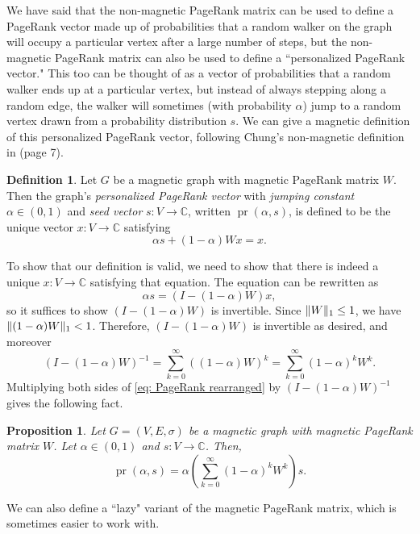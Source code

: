 \documentclass{article}
\newtheorem{prop}[thm]{Proposition}
\theoremstyle{definition}
\newtheorem{defn}[thm]{Definition}
\newcommand{\C}{\mathbb C}
\DeclarePairedDelimiter\norm{\lVert}{\rVert}
\DeclareMathOperator{\pr}{pr}
\begin{document}
We have said that the non-magnetic PageRank matrix can be used to define a PageRank vector made up of probabilities that a random walker on the graph will occupy a particular vertex after a large number of steps, but the non-magnetic PageRank matrix can also be used to define a ``personalized PageRank vector." This too can be thought of as a vector of probabilities that a random walker ends up at a particular vertex, but instead of always stepping along a random edge, the walker will sometimes (with probability $\alpha$) jump to a random vertex drawn from a probability distribution $s$. We can give a magnetic definition of this personalized PageRank vector, following Chung's non-magnetic definition in \cite{pagerankgreen} (page 7).

\begin{defn}
Let $G$ be a magnetic graph with magnetic PageRank matrix $W$. Then the graph's \textit{personalized PageRank vector} with \textit{jumping constant} $\alpha \in (0, 1)$ and \textit{seed vector} $s: V \rightarrow \C$, written $\pr(\alpha, s)$, is defined to be the unique vector $x: V \rightarrow \C$ satisfying
$$
\alpha s + (1 - \alpha) W x = x.
$$
\end{defn}

To show that our definition is valid, we need to show that there is indeed a unique $x : V \rightarrow \C$ satisfying that equation. The equation can be rewritten as 
\begin{equation}
\alpha s = (I - (1 - \alpha)W)x,\label{eq: PageRank rearranged}
\end{equation}
so it suffices to show $(I - (1 - \alpha)W)$ is invertible. Since $\norm{W}_1 \leq 1$, we have $\norm{(1 - \alpha)W}_1 < 1$. Therefore, $(I - (1 - \alpha)W)$ is invertible as desired, and moreover 
$$
(I - (1 - \alpha)W)^{-1} = \sum_{k=0}^{\infty} ((1 - \alpha) W)^k = \sum_{k=0}^{\infty} (1 - \alpha)^k W^k.
$$ 
Multiplying both sides of \cref{eq: PageRank rearranged} by $(I - (1 - \alpha)W)^{-1}$ gives the following fact.

\begin{prop}
Let $G = (V, E, \sigma)$ be a magnetic graph with magnetic PageRank matrix $W$. Let $\alpha \in (0, 1)$ and $s: V \rightarrow \C$. Then, $$\pr(\alpha, s) = \alpha \left( \sum_{k=0}^{\infty} (1 - \alpha)^k W^k \right) s.$$
\end{prop}

We can also define a ``lazy" variant of the magnetic PageRank matrix, which is sometimes easier to work with.
\end{document}
